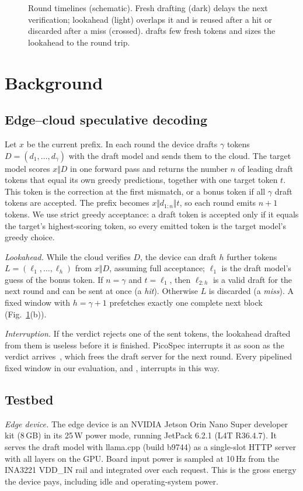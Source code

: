 \begin{figure}[t]
\centering

\caption{Round timelines (schematic). Fresh drafting (dark) delays the next verification; lookahead (light) overlaps it and is reused after a hit or discarded after a miss (crossed). \cape{} drafts few fresh tokens and sizes the lookahead to the round trip.}
\label{fig:timeline}
\end{figure}

\section{Background}
\label{sec:measure}

\subsection{Edge--cloud speculative decoding}
Let $x$ be the current prefix. In each round the device drafts $\gamma$ tokens $D=(d_1,\dots,d_\gamma)$ with the draft model and sends them to the cloud. The target model scores $x\Vert D$ in one forward pass and returns the number $n$ of leading draft tokens that equal its own greedy predictions, together with one target token $t$. This token is the correction at the first mismatch, or a bonus token if all $\gamma$ draft tokens are accepted. The prefix becomes $x\Vert d_{1:n}\Vert t$, so each round emits $n+1$ tokens. We use strict greedy acceptance: a draft token is accepted only if it equals the target's highest-scoring token, so every emitted token is the target model's greedy choice.

\emph{Lookahead.} While the cloud verifies $D$, the device can draft $h$ further tokens $L=(\ell_1,\dots,\ell_h)$ from $x\Vert D$, assuming full acceptance; $\ell_1$ is the draft model's guess of the bonus token. If $n=\gamma$ and $t=\ell_1$, then $\ell_{2:h}$ is a valid draft for the next round and can be sent at once (a \emph{hit}). Otherwise $L$ is discarded (a \emph{miss}). A fixed window with $h=\gamma+1$ prefetches exactly one complete next block (Fig.~\ref{fig:timeline}(b)).

\emph{Interruption.} If the verdict rejects one of the sent tokens, the lookahead drafted from them is useless before it is finished. PicoSpec interrupts it as soon as the verdict arrives~\cite{picospec2026}, which frees the draft server for the next round. Every pipelined fixed window in our evaluation, and \cape{}, interrupts in this way.

\subsection{Testbed}
\label{sec:testbed}
\emph{Edge device.} The edge device is an NVIDIA Jetson Orin Nano Super developer kit (8\,GB) in its 25\,W power mode, running JetPack 6.2.1 (L4T R36.4.7). It serves the draft model with llama.cpp (build b9744) as a single-slot HTTP server with all layers on the GPU. Board input power is sampled at 10\,Hz from the INA3221 VDD\_IN rail and integrated over each request. This is the gross energy the device pays, including idle and operating-system power.

